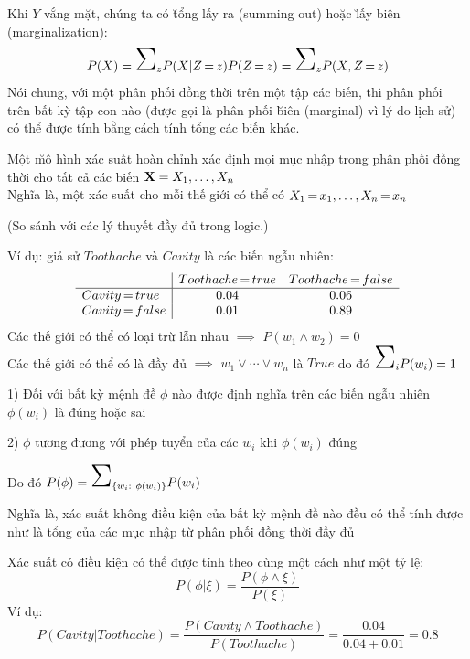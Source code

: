 \documentclass[fleqn]{article}
\begin{document}
\begin{huge}
Khi $Y$ vắng mặt, chúng ta có \u{tổng lấy ra (summing out)} hoặc \u{lấy biên (marginalization)}:
\[
  P(X) = \mysum_z P(X|Z\eq z) P(Z\eq z) = \mysum_z P(X,Z\eq z)
\]
Nói chung, với một phân phối đồng thời trên một tập các biến, thì
phân phối trên bất kỳ tập con nào (được gọi là phân phối \u{biên (marginal)} vì
lý do lịch sử) có thể được tính bằng cách tính tổng các biến khác.



Một \u{mô hình xác suất hoàn chỉnh} xác định mọi mục nhập trong phân phối
đồng thời cho tất cả các biến $\mbox{{\bf X}} = X_1,\ldots,X_n$\\
Nghĩa là, một xác suất cho mỗi thế giới có thể có $X_1{\,{=}\,} x_1,\ldots,X_n{\,{=}\,} x_n$

(So sánh với các lý thuyết đầy đủ trong logic.)


Ví dụ: giả sử $Toothache$ và $Cavity$ là các biến ngẫu nhiên:
\[\begin{array}{l|cc}
 & Toothache{\,{=}\,} true & Toothache{\,{=}\,} false \\
\hline
Cavity {\,{=}\,} true  & 0.04 & 0.06 \\
Cavity {\,{=}\,} false & 0.01 & 0.89
\end{array}\]
Các thế giới có thể có loại trừ lẫn nhau $\implies$ $P(w_1 \land w_2) = 0$\\
Các thế giới có thể có là đầy đủ $\implies$ $w_1 \lor \cdots \lor w_n$ là $True$\nl
do đó $\mysum_i P(w_i) = 1$




1) Đối với bất kỳ mệnh đề $\phi$ nào được định nghĩa trên các biến ngẫu nhiên\nl
   $\phi(w_i)$ là đúng hoặc sai

2) $\phi$ tương đương với phép tuyển của các $w_i$ khi $\phi(w_i)$ đúng

Do đó $P(\phi) = \mysum_{\{w_i:\ \phi(w_i)\}} P(w_i)$

Nghĩa là, xác suất không điều kiện của bất kỳ mệnh đề nào đều có thể tính được
như là tổng của các mục nhập từ phân phối đồng thời đầy đủ

Xác suất có điều kiện có thể được tính theo cùng một cách như một tỷ lệ:
\[
  P(\phi|\xi) = \frac{P(\phi\land \xi)}{P(\xi)}
\]
Ví dụ: 
\[
  P(Cavity |Toothache) 
   = \frac{P(Cavity \land Toothache)}{P(Toothache)}
   = \frac{0.04}{0.04+0.01} = 0.8
\]





\end{huge}
\end{document}
